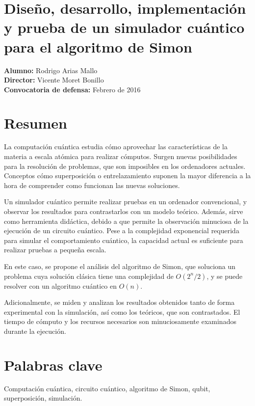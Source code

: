 


\thispagestyle{empty}
\section*{Diseño, desarrollo, implementación y prueba de un simulador cuántico 
para el algoritmo de Simon}

\vspace{1cm}

\noindent
\textbf{Alumno:} Rodrigo Arias Mallo\\
\textbf{Director:} Vicente Moret Bonillo \\
\textbf{Convocatoria de defensa:} Febrero de 2016\\

\section*{Resumen}
\noindent
La computación cuántica estudia cómo aprovechar las características de la 
materia a escala atómica para realizar cómputos. Surgen nuevas posibilidades 
para la resolución de problemas, que son imposibles en los ordenadores actuales.  
Conceptos cómo superposición o entrelazamiento suponen la mayor diferencia a la 
hora de comprender como funcionan las nuevas soluciones.

Un simulador cuántico permite realizar pruebas en un ordenador convencional, y 
observar los resultados para contrastarlos con un modelo teórico. Además, sirve 
como herramienta didáctica, debido a que permite la observación minuciosa de la 
ejecución de un circuito cuántico. Pese a la complejidad exponencial requerida 
para simular el comportamiento cuántico, la capacidad actual es suficiente para 
realizar pruebas a pequeña escala.

En este caso, se propone el análisis del algoritmo de Simon, que soluciona un 
problema cuya solución clásica tiene una complejidad de $O(2^n/2)$, y se puede 
resolver con un algoritmo cuántico en $O(n)$.

Adicionalmente, se miden y analizan los resultados obtenidos tanto de forma 
experimental con la simulación, así como los teóricos, que son contrastados. El 
tiempo de cómputo y los recursos necesarios son minuciosamente examinados 
durante la ejecución.


\section*{Palabras clave}
\noindent
Computación cuántica, circuito cuántico, algoritmo de Simon, qubit,
superposición, simulación.

